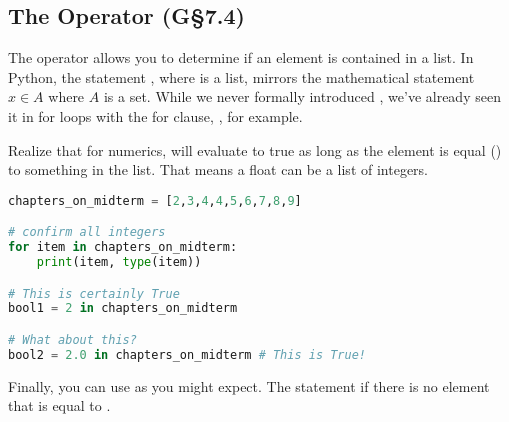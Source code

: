 
\subsection{The  Operator (G\S7.4)}

The  operator allows you to determine if an element is contained in a list. In Python, the statement , where  is a list, mirrors the mathematical statement $x\in A$ where $A$ is a set. While we never formally introduced , we've already seen it in for loops with the for clause, , for example.

\smallskip

Realize that for numerics,  will evaluate to true as long as the element is equal (\code{==}) to something in the list. That means a float can be  a list of integers.

\begin{lstlisting}[language = Python]
chapters_on_midterm = [2,3,4,4,5,6,7,8,9]

# confirm all integers
for item in chapters_on_midterm:
    print(item, type(item))

# This is certainly True
bool1 = 2 in chapters_on_midterm

# What about this? 
bool2 = 2.0 in chapters_on_midterm # This is True!
\end{lstlisting}

\smallskip

\noindent Finally, you can use  as you might expect. The statement  if there is no element  that is equal to .
